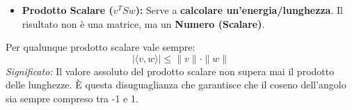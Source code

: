 \documentclass[10pt,a4paper]{article}
\begin{document}
\begin{tcolorbox}[colback=blue!5!white,colframe=blue!75!black,title=\textbf{Riepilogo}]
\begin{tcolorbox}[colback=green!5!white,colframe=green!60!black,title=\textbf{}]
\begin{itemize}
    \item \textbf{Prodotto Scalare ($v^T S w$):}
    Serve a \textbf{calcolare un'energia/lunghezza}.
    Il risultato non è una matrice, ma un \textbf{Numero (Scalare)}.
    
    
\end{itemize}
\end{tcolorbox}
\begin{tcolorbox}[colback=yellow!10!white,colframe=yellow!75!black,title=\textbf{TEOREMA: Disuguaglianza di Cauchy-Schwarz}]
Per qualunque prodotto scalare vale sempre:
\[ | \langle v, w \rangle | \le \|v\| \cdot \|w\| \]
\textit{Significato:} Il valore assoluto del prodotto scalare non supera mai il prodotto delle lunghezze.
È questa disuguaglianza che garantisce che il coseno dell'angolo sia sempre compreso tra -1 e 1.
\end{tcolorbox}

\vspace{0.4cm}
\end{tcolorbox}

\vspace{0.5cm}
\end{document}
